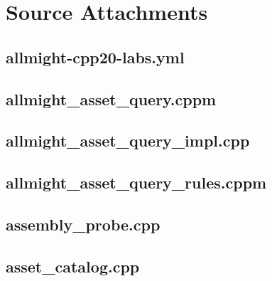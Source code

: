 \documentclass[11pt,twoside,openany]{book}
\begin{document}
\chapter{Source Attachments}
\hypertarget{source-file-3b1d957d4b185d11d5c207e1}{}
\label{attachmentstart:source-file-3b1d957d4b185d11d5c207e1}
\section*{allmight-cpp20-labs.yml}
\hypertarget{source-file-453ba365bb56ed2f6e4c3f8e}{}
\label{attachmentstart:source-file-453ba365bb56ed2f6e4c3f8e}
\section*{allmight\_asset\_query.cppm}
\hypertarget{source-file-26fa02737266a08f013cdbb5}{}
\label{attachmentstart:source-file-26fa02737266a08f013cdbb5}
\section*{allmight\_asset\_query\_impl.cpp}
\hypertarget{source-file-b84757ff09b490e82f7f98ea}{}
\label{attachmentstart:source-file-b84757ff09b490e82f7f98ea}
\section*{allmight\_asset\_query\_rules.cppm}
\hypertarget{source-file-eab7d4e282f0926fda89ab31}{}
\label{attachmentstart:source-file-eab7d4e282f0926fda89ab31}
\section*{assembly\_probe.cpp}
\hypertarget{source-file-04abded74b7e03edc5dcf870}{}
\label{attachmentstart:source-file-04abded74b7e03edc5dcf870}
\section*{asset\_catalog.cpp}
\hypertarget{source-file-0529c78555b675a2ae111228}{}
\label{attachmentstart:source-file-0529c78555b675a2ae111228}
\end{document}
